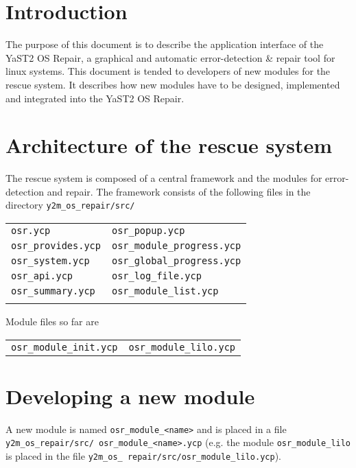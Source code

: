 \section{Introduction}
The purpose of this document is to describe the application interface
of the YaST2 OS Repair, a graphical and automatic error-detection \& repair
tool for linux systems. This document is tended to developers of new modules
for the rescue system. It describes how new modules have to be designed,
implemented and integrated into the YaST2 OS Repair.

\section{Architecture of the rescue system}
The rescue system is composed of a central framework and the modules for
error-detection and repair. The framework consists of the following files
in the directory \verb+y2m_os_repair/src/+\\

\begin{tabular}{p{5cm}p{5cm}}
\verb+osr.ycp+          & \verb+osr_popup.ycp+\\
\verb+osr_provides.ycp+ & \verb+osr_module_progress.ycp+\\
\verb+osr_system.ycp+   & \verb+osr_global_progress.ycp+\\
\verb+osr_api.ycp+      & \verb+osr_log_file.ycp+\\
\verb+osr_summary.ycp+  & \verb+osr_module_list.ycp+\\\\
\end{tabular}

Module files so far are\\

\begin{tabular}{p{5cm}p{5cm}}
\verb+osr_module_init.ycp+ & \verb+osr_module_lilo.ycp+\\
\end{tabular}

\section{Developing a new module}
A new module is named \verb+osr_module_<name>+ and is placed in a file
{\tt y2m\_os\_repair/src/ osr\_module\_<name>.ycp} (e.g. the module
\verb+osr_module_lilo+ is placed in the file 
{\tt y2m\_os\_ repair/src/osr\_module\_lilo.ycp}).\\

